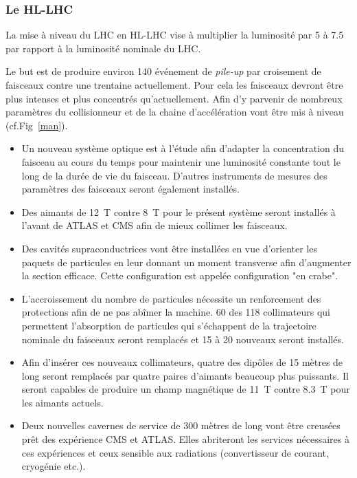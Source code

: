 \subsubsection{Le HL-LHC}
La mise à niveau du LHC en HL-LHC vise à multiplier la luminosité par \num{5} à \num{7.5} par rapport à la luminosité nominale du LHC.

Le but est de produire environ \num{140} événement de \textit{pile-up} par croisement de faisceaux contre une trentaine actuellement. Pour cela les faisceaux devront être plus intenses et plus concentrés qu'actuellement. Afin d'y parvenir de nombreux paramètres du collisionneur et de la chaine d'accélération vont être mis à niveau (cf.Fig~\ref{man}).

\begin{itemize}[label=$\bullet$]
	
 \item Un nouveau système optique est à l'étude afin d'adapter la concentration du faisceau au cours du temps pour maintenir une luminosité constante tout le long de la durée de vie du faisceau. D'autres instruments de mesures des paramètres des faisceaux seront également installés.
 
 \item Des aimants de \SI{12}{\tesla} contre \SI{8}{\tesla} pour le présent système seront installés à l'avant de ATLAS et CMS afin de mieux collimer les faisceaux.
 
 \item Des cavités supraconductrices vont être installées en vue d'orienter les paquets de particules en leur donnant un moment transverse afin d'augmenter la section efficace. Cette configuration est appelée configuration "en crabe".
 
 \item L'accroissement du nombre de particules nécessite un renforcement des protections afin de ne pas abîmer la machine. \num{60} des \num{118} collimateurs qui permettent l'absorption de particules qui s'échappent de la trajectoire nominale du faisceaux seront remplacés et \num{15} à \num{20} nouveaux seront installés.
 
 \item Afin d'insérer ces nouveaux collimateurs, quatre des dipôles de \num{15} mètres de long seront remplacés par quatre paires d'aimants beaucoup plus puissants. Il seront capables de produire un champ magnétique de \SI{11}{\tesla} contre \SI{8.3}{\tesla} pour les aimants actuels.
 
 \item Deux nouvelles cavernes de service de \num{300} mètres de long vont être creusées prêt des expérience CMS et ATLAS. Elles abriteront les services nécessaires à ces expériences et ceux sensible aux radiations (convertisseur de courant, cryogénie etc.).
 

\end{itemize}
